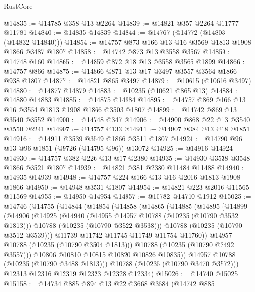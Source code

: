 \begin{lexlean}{RustCore}
\begin{coremodule}
@14835 := @14785 @358 @13 @2264
@14839 := @14821 @357 @2264 @11777 @11781
@14840 := @14835 @14839
@14844 := @14767 (@14772 (@14803 (@14832 @14840)))
@14854 := @14757 @873 @166 @13 @16 @3569 @1813 @1908 @1866 @3487 @1807
@14858 := @14742 @873 @13 @3558 @3567
@14859 := @14748 @160
@14865 := @14859 @872 @18 @13 @3558 @3565 @1899
@14866 := @14757 @866
@14875 := @14866 @871 @13 @17 @3497 @3557 @3564 @1866 @938 @1807
@14877 := @14821 @865 @3497
@14879 := @10615 (@10616 @3497)
@14880 := @14877 @14879
@14883 := @10235 (@10621 @865 @13)
@14884 := @14880 @14883
@14885 := @14875 @14884
@14895 := @14757 @869 @166 @13 @16 @3554 @1813 @1908 @1866 @3503 @1807
@14899 := @14742 @869 @13 @3540 @3552
@14900 := @14748 @347
@14906 := @14900 @868 @22 @13 @3540 @3550 @2241
@14907 := @14757 @133
@14911 := @14907 @384 @13 @18 @1851
@14916 := @14911 @3539 @3549 @1866 @3511 @1807
@14924 := @14790 @96 @13 @96 @1851 (@9726 (@14795 @96)) @13072
@14925 := @14916 @14924
@14930 := @14757 @382 @226 @13 @17 @2380
@14935 := @14930 @3538 @3548 @1866 @3521 @1807
@14939 := @14821 @381 @2380 @11484 @11488
@14940 := @14935 @14939
@14948 := @14757 @224 @166 @13 @16 @2016 @1813 @1908 @1866
@14950 := @14948 @3531 @1807
@14954 := @14821 @223 @2016 @11565 @11569
@14955 := @14950 @14954
@14957 := @10782 @14710 @1912
@15025 := @14746
    (@14755
      (@14844
        (@14854
          (@14858
            (@14865
              (@14885
                (@14895
                  (@14899
                    (@14906
                      (@14925
                        (@14940
                          (@14955 @14957 @10788 (@10235 (@10790 @3532 @1813)))
                          @10788
                          (@10235 (@10790 @3522 @3538)))
                        @10788
                        (@10235 (@10790 @3512 @3539)))
                      @11739
                      @11742
                      @11745
                      @11749
                      @11754
                      @11760))
                  @14957
                  @10788
                  (@10235 (@10790 @3504 @1813)))
                @10788
                (@10235 (@10790 @3492 @3557)))
              @10806
              @10810
              @10815
              @10820
              @10826
              @10835))
          @14957
          @10788
          (@10235 (@10790 @3488 @1813)))
        @10788
        (@10235 (@10790 @3470 @3572)))
      @12313
      @12316
      @12319
      @12323
      @12328
      @12334)
@15026 := @14740 @15025
@15158 := @14734
    @885
    @894
    @13
    @22
    @3668
    @3684
    (@14742
      @885

\end{coremodule}
\end{lexlean}
